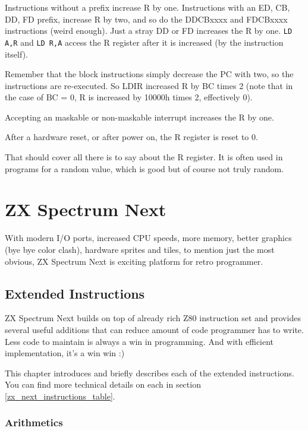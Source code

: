 \documentclass[oneside,a4paper]{book}
\begin{document}
Instructions without a prefix increase R by one. Instructions with an ED, CB, DD, FD prefix, increase R by two, and so do the DDCBxxxx and FDCBxxxx instructions (weird enough). Just a stray DD or FD increases the R by one. {\tt LD A,R} and {\tt LD R,A} access the R register after it is increased (by the instruction itself). 

Remember that the block instructions simply decrease the PC with two, so the instructions are re-executed. So LDIR increased R by BC times 2 (note that in the case of BC = 0, R is increased by 10000h times 2, effectively 0).

Accepting an maskable or non-maskable interrupt increases the R by one.

After a hardware reset, or after power on, the R register is reset to 0.

That should cover all there is to say about the R register. It is often used in programs for a random value, which is good but of course not truly random.




\chapter{ZX Spectrum Next}

With modern I/O ports, increased CPU speeds, more memory, better graphics (bye bye color clash), hardware sprites and tiles, to mention just the most obvious, ZX Spectrum Next is exciting platform for retro programmer.


\section{Extended Instructions}

ZX Spectrum Next builds on top of already rich Z80 instruction set and provides several useful additions that can reduce amount of code programmer has to write. Less code to maintain is always a win in programming. And with efficient implementation, it's a win win :)

This chapter introduces and briefly describes each of the extended instructions. You can find more technical details on each in section \ref{zx_next_instructions_table}.

\newcommand\instritem[1]{\item[{\tt #1}] \hfill}

\subsection{Arithmetics}
\end{document}
